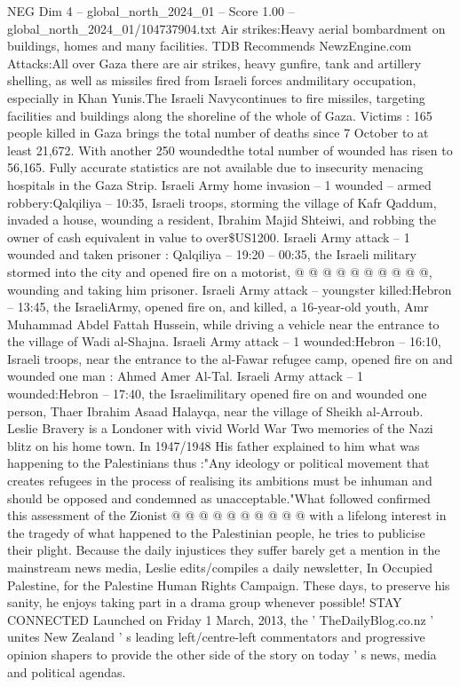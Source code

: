 \begin{textsample}{NEG Dim 4 – global\_north\_2024\_01 – Score 1.00 – global\_north\_2024\_01/104737904.txt}  \label{ex:f4_neg_123}
Air strikes:Heavy aerial bombardment on buildings, homes and many facilities.
TDB Recommends NewzEngine.com Attacks:All over Gaza there are air strikes, heavy gunfire, tank and artillery shelling, as well as missiles fired from Israeli forces andmilitary occupation, especially in Khan Yunis.The Israeli Navycontinues to fire missiles, targeting facilities and buildings along the shoreline of the whole of Gaza.
Victims : 165 people killed in Gaza brings the total number of deaths since 7 October to at least 21,672.
With another 250 woundedthe total number of wounded has risen to 56,165.
Fully accurate statistics are not available due to insecurity menacing hospitals in the Gaza Strip.
Israeli Army home invasion -- 1 wounded -- armed robbery:Qalqiliya -- 10:35, Israeli troops, storming the village of Kafr Qaddum, invaded a house, wounding a resident, Ibrahim Majid Shteiwi, and robbing the owner of cash equivalent in value to over\$US1200.
Israeli Army attack -- 1 wounded and taken prisoner : Qalqiliya -- 19:20 -- 00:35, the Israeli military stormed into the city and opened fire on a motorist, @ @ @ @ @ @ @ @ @ @, wounding and taking him prisoner.
Israeli Army attack -- youngster killed:Hebron -- 13:45, the IsraeliArmy, opened fire on, and killed, a 16-year-old youth, Amr Muhammad Abdel Fattah Hussein, while driving a vehicle near the entrance to the village of Wadi al-Shajna.
Israeli Army attack -- 1 wounded:Hebron -- 16:10, Israeli troops, near the entrance to the al-Fawar refugee camp, opened fire on and wounded one man : Ahmed Amer Al-Tal.
Israeli Army attack -- 1 wounded:Hebron -- 17:40, the Israelimilitary opened fire on and wounded one person, Thaer Ibrahim Asaad Halayqa, near the village of Sheikh al-Arroub.
Leslie Bravery is a Londoner with vivid World War Two memories of the Nazi blitz on his home town.
In 1947/1948 His father explained to him what was happening to the Palestinians thus :"Any ideology or political movement that creates refugees in the process of realising its ambitions must be inhuman and should be opposed and condemned as unacceptable."What followed confirmed this assessment of the Zionist @ @ @ @ @ @ @ @ @ @ with a lifelong interest in the tragedy of what happened to the Palestinian people, he tries to publicise their plight.
Because the daily injustices they suffer barely get a mention in the mainstream news media, Leslie edits/compiles a daily newsletter, In Occupied Palestine, for the Palestine Human Rights Campaign.
These days, to preserve his sanity, he enjoys taking part in a drama group whenever possible!
STAY CONNECTED Launched on Friday 1 March, 2013, the ' TheDailyBlog.co.nz ' unites New Zealand ' s leading left/centre-left commentators and progressive opinion shapers to provide the other side of the story on today ' s news, media and political agendas.

\end{textsample}
